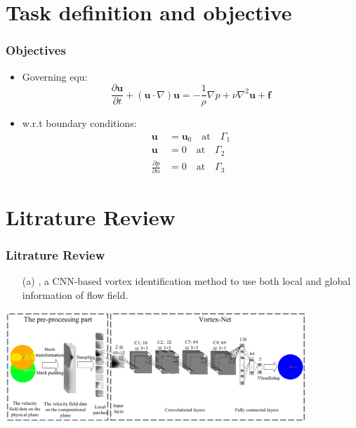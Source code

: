 \documentclass[aspectratio=169]{beamer}
\begin{document}
\section{Task definition and objective}
\begin{frame}
  \frametitle{Objectives}
  \begin{itemize}
    \item Governing equ:\\
      \begin{equation}
        \frac{\partial \mathbf{u}}{\partial t} + (\mathbf{u} \cdot \nabla)\mathbf{u} = -\frac{1}{\rho}\nabla p + \nu \nabla^2 \mathbf{u} + \mathbf{f}
      \end{equation}
    \item w.r.t boundary conditions:\\
    \begin{align}
      \mathbf{u} &= \mathbf{u}_0 \quad \text{at} \quad \Gamma_1 \\
      \mathbf{u} &= 0 \quad \text{at} \quad \Gamma_2 \\
      \frac{\partial p}{\partial n} &= 0 \quad \text{at} \quad \Gamma_3
    \end{align}

  \end{itemize}
\end{frame}
\section{Litrature Review}
\begin{frame}
  \frametitle{Litrature Review}
  \begin{itemize}
    \item[(a)]  \cite{Liang2018}, a CNN-based vortex identification method to use both local and global information of flow field.
  \end{itemize}
  \begin{center}
    \includegraphics[width=0.85\textwidth]{paper_review.png}
  \end{center}
\end{frame}
\end{document}
